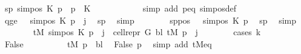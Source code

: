 \begin{isabellebody}
\ sp{\isacharcolon}{\kern0pt}\ {\isachardoublequoteopen}sim{\isacharunderscore}{\kern0pt}pos\ {\isacharquery}{\kern0pt}K\ p\ {\isacharequal}{\kern0pt}\ p{}\ {\isacharasterisk}{\kern0pt}\ {\isacharquery}{\kern0pt}K\ {\isacharplus}{\kern0pt}\ {}{\isachardoublequoteclose}\isanewline
\ \ \ \ \ \ \ \ \isamarkupfalse%
\ {\isacharparenleft}{\kern0pt}simp\ add{\isacharcolon}{\kern0pt}\ p{\isacharunderscore}{\kern0pt}eq\ sim{\isacharunderscore}{\kern0pt}pos{\isacharunderscore}{\kern0pt}def{\isacharparenright}{\kern0pt}\isanewline
\ \ \ \ \ \ \isamarkupfalse%
\ q{\isacharunderscore}{\kern0pt}ge{}{\isacharcolon}{\kern0pt}\ {\isachardoublequoteopen}{}\ {\isasymle}\ sim{\isacharunderscore}{\kern0pt}pos\ {\isacharquery}{\kern0pt}K\ p\ {\isacharplus}{\kern0pt}\ j{\isachardoublequoteclose}\ \isamarkupfalse%
\ sp\ \isamarkupfalse%
\ simp\isanewline
\ \ \ \ \ \ \isamarkupfalse%
\ sppos{\isacharcolon}{\kern0pt}\ {\isachardoublequoteopen}{}\ {\isacharless}{\kern0pt}\ sim{\isacharunderscore}{\kern0pt}pos\ {\isacharquery}{\kern0pt}K\ p{\isachardoublequoteclose}\ \isamarkupfalse%
\ sp\ \isamarkupfalse%
\ simp\isanewline
\ \ \ \ \ \ \isamarkupfalse%
\ {\isachardoublequoteopen}{\isacharquery}{\kern0pt}tM{\isacharprime}{\kern0pt}\ {\isacharparenleft}{\kern0pt}sim{\isacharunderscore}{\kern0pt}pos\ {\isacharquery}{\kern0pt}K\ p\ {\isacharplus}{\kern0pt}\ j{\isacharparenright}{\kern0pt}\ {\isacharequal}{\kern0pt}\ cell{\isacharunderscore}{\kern0pt}repr\ {\isacharquery}{\kern0pt}G\ {\isacharquery}{\kern0pt}bl\ {\isacharparenleft}{\kern0pt}{\isacharquery}{\kern0pt}tM\ p{\isacharparenright}{\kern0pt}\ {\isacharbang}{\kern0pt}\ j{\isachardoublequoteclose}\isanewline
\ \ \ \ \ \ \isamarkupfalse%
\ {\isacharparenleft}{\kern0pt}cases\ {\isachardoublequoteopen}k\ {\isacharequal}{\kern0pt}\ {}{\isachardoublequoteclose}{\isacharparenright}{\kern0pt}\isanewline
\ \ \ \ \ \ \ \ \isamarkupfalse%
\ False\isanewline
\ \ \ \ \ \ \ \ \isamarkupfalse%
\ {\isachardoublequoteopen}{\isacharquery}{\kern0pt}tM\ p\ {\isacharequal}{\kern0pt}\ {\isacharquery}{\kern0pt}bl{\isachardoublequoteclose}\ \isamarkupfalse%
\ False\ p{}\ \isamarkupfalse%
\ {\isacharparenleft}{\kern0pt}simp\ add{\isacharcolon}{\kern0pt}\ tM{\isacharunderscore}{\kern0pt}eq{\isacharparenright}{\kern0pt}\isanewline

\end{isabellebody}
